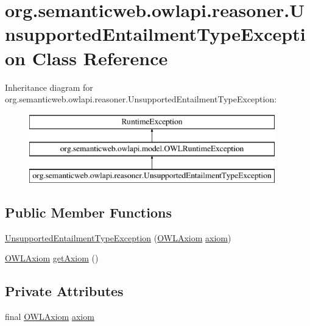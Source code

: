 \hypertarget{classorg_1_1semanticweb_1_1owlapi_1_1reasoner_1_1_unsupported_entailment_type_exception}{\section{org.\-semanticweb.\-owlapi.\-reasoner.\-Unsupported\-Entailment\-Type\-Exception Class Reference}
\label{classorg_1_1semanticweb_1_1owlapi_1_1reasoner_1_1_unsupported_entailment_type_exception}
}
Inheritance diagram for org.\-semanticweb.\-owlapi.\-reasoner.\-Unsupported\-Entailment\-Type\-Exception\-:\begin{figure}[H]
\begin{center}
\leavevmode
\includegraphics[height=3.000000cm]{classorg_1_1semanticweb_1_1owlapi_1_1reasoner_1_1_unsupported_entailment_type_exception}
\end{center}
\end{figure}
\subsection*{Public Member Functions}
\begin{DoxyCompactItemize}
\item 
\hyperlink{classorg_1_1semanticweb_1_1owlapi_1_1reasoner_1_1_unsupported_entailment_type_exception_a39324315a39f3d1897e1c593a6a79bb9}{Unsupported\-Entailment\-Type\-Exception} (\hyperlink{interfaceorg_1_1semanticweb_1_1owlapi_1_1model_1_1_o_w_l_axiom}{O\-W\-L\-Axiom} \hyperlink{classorg_1_1semanticweb_1_1owlapi_1_1reasoner_1_1_unsupported_entailment_type_exception_abcda02fe14216d9cfda036f8962b36b6}{axiom})
\item 
\hyperlink{interfaceorg_1_1semanticweb_1_1owlapi_1_1model_1_1_o_w_l_axiom}{O\-W\-L\-Axiom} \hyperlink{classorg_1_1semanticweb_1_1owlapi_1_1reasoner_1_1_unsupported_entailment_type_exception_a5940fd1ddcee74a709cf211beb39a7ca}{get\-Axiom} ()
\end{DoxyCompactItemize}
\subsection*{Private Attributes}
\begin{DoxyCompactItemize}
\item 
final \hyperlink{interfaceorg_1_1semanticweb_1_1owlapi_1_1model_1_1_o_w_l_axiom}{O\-W\-L\-Axiom} \hyperlink{classorg_1_1semanticweb_1_1owlapi_1_1reasoner_1_1_unsupported_entailment_type_exception_abcda02fe14216d9cfda036f8962b36b6}{axiom}
\end{DoxyCompactItemize}
